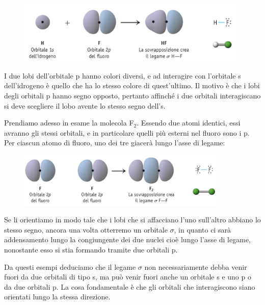 \vspace{-0.4cm}\begin{figure}[H]
    \centering
    \includegraphics[width=11cm]{immagini/legame_H-F.png}
\end{figure}

\vspace{-0.5cm}I due lobi dell'orbitale p hanno colori diversi, e ad interagire con l'orbitale s dell'idrogeno è quello che ha lo stesso colore di quest'ultimo. Il motivo è che i lobi degli orbitali p hanno segno opposto, pertanto affinché i due orbitali interagiscano si deve scegliere il lobo avente lo stesso segno dell's.

\vspace{0.2cm} Prendiamo adesso in esame la molecola F$_2$. Essendo due atomi identici, essi avranno gli stessi orbitali, e in particolare quelli più esterni nel fluoro sono i p. Per ciascun atomo di fluoro, uno dei tre giacerà lungo l'asse di legame:

\vspace{-0.4cm}\begin{figure}[H]
    \centering
    \includegraphics[width=10cm]{immagini/legame-F_2.png}
\end{figure}

\vspace{-0.5cm}Se li orientiamo in modo tale che i lobi che si affacciano l'uno sull'altro abbiano lo stesso segno, ancora una volta otterremo un orbitale $\sigma$, in quanto ci sarà addensamento lungo la congiungente dei due nuclei cioè lungo l'asse di legame, nonostante esso si stia formando tramite due orbitali p.

\vspace{0.2cm} Da questi esempi deduciamo che il legame $\sigma$ non necessariamente debba venir fuori da due orbitali di tipo s, ma può venir fuori anche un orbitale s e uno p o da due orbitali p. La cosa fondamentale è che gli orbitali che interagiscono siano orientati lungo la stessa direzione.
